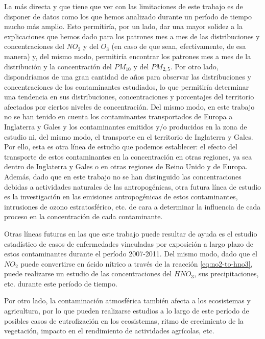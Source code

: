 \documentclass[12pt]{article}
\begin{document}
La más directa y que tiene que ver con las limitaciones de este trabajo es de disponer de datos como los que hemos analizado durante un período de tiempo mucho más amplio. Esto permitiría, por un lado, dar una mayor solidez a la explicaciones que hemos dado para los patrones mes a mes de las distribuciones y concentraciones del $NO_{2}$ y del $O_{3}$ (en caso de que sean, efectivamente, de esa manera) y, del mismo modo, permitiría encontrar los patrones mes a mes de la distribución y la concentración del $PM_{10}$ y del $PM_{2,5}$. Por otro lado, dispondríamos de una gran cantidad de años para observar las distribuciones y concentraciones de los contaminantes estudiados, lo que permitiría determinar una tendencia en sus distribuciones, concentraciones y porcentajes del territorio afectados por ciertos niveles de concentración. Del mismo modo, en este trabajo no se han tenido en cuenta los contaminantes transportados de Europa a Inglaterra y Gales y los contaminantes emitidos y/o producidos en la zona de estudio ni, del mismo modo, el transporte en el territorio de Inglaterra y Gales. Por ello, esta es otra línea de estudio que podemos establecer: el efecto del transporte de estos contaminantes en la concentración en otras regiones, ya sea dentro de Inglaterra y Gales o en otras regiones de Reino Unido y de Europa. Además, dado que en este trabajo no se han distinguido las concentraciones debidas a actividades naturales de las antropogénicas, otra futura línea de estudio es la investigación en las emisiones antropogénicas de estos contaminantes, intrusiones de ozono estratosférico, etc. de cara a determinar la influencia de cada proceso en la concentración de cada contaminante. 

Otras líneas futuras en las que este trabajo puede resultar de ayuda es el estudio estadístico de casos de enfermedades vinculadas por exposición a largo plazo de estos contaminantes durante el período 2007-2011. Del mismo modo, dado que el $NO_{2}$ puede convertirse en ácido nítrico a través de la reacción \ref{eq:no2-to-hno3}, puede realizarse un estudio de las concentraciones del $HNO_{3}$, sus precipitaciones, etc. durante este período de tiempo.

Por otro lado, la contaminación atmosférica también afecta a los ecosistemas y agricultura, por lo que pueden realizarse estudios a lo largo de este período de posibles casos de eutrofización en los ecosistemas, ritmo de crecimiento de la vegetación, impacto en el rendimiento de actividades agrícolas, etc.

\newpage
\end{document}

